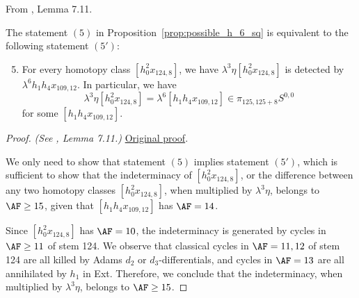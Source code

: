 \begin{lemma}
\label{paper:7.11}
From \cite{LWX126}, Lemma 7.11.\par
\label{lem:equistate5}
    The statement $(5)$ in Proposition~\ref{prop:possible_h_6_sq} is equivalent to the following statement $(5')$:
    \begin{enumerate}[label=(\arabic*')]\setcounter{enumi}{4} 
    \item For every homotopy class $[h_0^2x_{124,8}]$, we have
    $\lambda^3 \eta [h_0^2x_{124,8}]$ is detected by $\lambda^6 h_1h_4x_{109,12}$. In particular, we have 
    $$\lambda^3 \eta [h_0^2x_{124,8}] = \lambda^6 [h_1h_4x_{109,12}] \in \pi_{125,125+8} S^{0,0}$$
    for some $[h_1h_4x_{109,12}]$.
    \end{enumerate}


\end{lemma}
\begin{proof}
\textit{(See \cite{LWX126}, Lemma 7.11.)} \href{paper/main.tex.html#L2254}{Original proof}.

We only need to show that statement $(5)$ implies statement $(5')$, which is sufficient to show that the indeterminacy of $[h_0^2x_{124,8}]$, or the difference between any two homotopy classes $[h_0^2x_{124,8}]$, when multiplied by $\lambda^3 \eta$, belongs to $\AF \ge 15$, given that $[h_1h_4x_{109,12}]$ has $\AF=14$.

    Since $[h_0^2x_{124,8}]$ has $\AF=10$, the indeterminacy is generated by cycles in $\AF \ge 11$ of stem 124. We observe that classical cycles in $\AF=11, 12$ of stem 124 are all killed by Adams $d_2$ or $d_3$-differentials, and cycles in $\AF=13$ are all annihilated by $h_1$ in Ext. Therefore, we conclude that the indeterminacy, when multiplied by $\lambda^3 \eta$, belongs to $\AF \ge 15$.
\end{proof}

